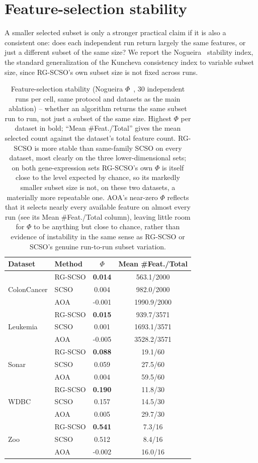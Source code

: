\documentclass[9pt]{article}
\begin{document}
\FloatBarrier
\section{Feature-selection stability}
A smaller selected subset is only a stronger
practical claim if it is also a consistent one: does each independent run
return largely the same features, or just a different subset of the same
size? We report the Nogueira~\cite{nogueira2018stability} stability index,
the standard generalization of the Kuncheva consistency index to variable
subset size, since RG-SCSO's own subset size is not fixed across runs.

\begin{table}[t]
\centering
\caption{Feature-selection stability (Nogueira $\Phi$~\cite{nogueira2018stability}, 30 independent runs per cell, same protocol and datasets as the main ablation) -- whether an algorithm returns the same subset run to run, not just a subset of the same size. Highest $\Phi$ per dataset in bold; ``Mean \#Feat./Total'' gives the mean selected count against the dataset's total feature count. RG-SCSO is more stable than same-family SCSO on every dataset, most clearly on the three lower-dimensional sets; on both gene-expression sets RG-SCSO's own $\Phi$ is itself close to the level expected by chance, so its markedly smaller subset size is not, on these two datasets, a materially more repeatable one. AOA's near-zero $\Phi$ reflects that it selects nearly every available feature on almost every run (see its Mean \#Feat./Total column), leaving little room for $\Phi$ to be anything but close to chance, rather than evidence of instability in the same sense as RG-SCSO or SCSO's genuine run-to-run subset variation.}
\label{tab:stability}
\footnotesize
\begin{tabular}{llcc}
\toprule
Dataset & Method & $\Phi$ & Mean \#Feat./Total \\
\midrule
\multirow{3}{*}{ColonCancer} & RG-SCSO & \textbf{0.014} & 563.1/2000 \\
 & SCSO & 0.004 & 982.0/2000 \\
 & AOA & -0.001 & 1990.9/2000 \\
\midrule
\multirow{3}{*}{Leukemia} & RG-SCSO & \textbf{0.015} & 939.7/3571 \\
 & SCSO & 0.001 & 1693.1/3571 \\
 & AOA & -0.005 & 3528.2/3571 \\
\midrule
\multirow{3}{*}{Sonar} & RG-SCSO & \textbf{0.088} & 19.1/60 \\
 & SCSO & 0.059 & 27.5/60 \\
 & AOA & 0.004 & 59.5/60 \\
\midrule
\multirow{3}{*}{WDBC} & RG-SCSO & \textbf{0.190} & 11.8/30 \\
 & SCSO & 0.157 & 14.5/30 \\
 & AOA & 0.005 & 29.7/30 \\
\midrule
\multirow{3}{*}{Zoo} & RG-SCSO & \textbf{0.541} & 7.3/16 \\
 & SCSO & 0.512 & 8.4/16 \\
 & AOA & -0.002 & 16.0/16 \\
\bottomrule
\end{tabular}
\end{table}
\end{document}
